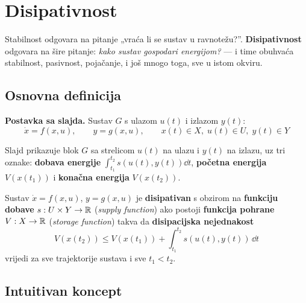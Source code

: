 \section{Disipativnost}
\label{sec:disipativnost}

Stabilnost odgovara na pitanje „vraća li se sustav u ravnotežu?”.
\textbf{Disipativnost} odgovara na šire pitanje: \emph{kako sustav gospodari
energijom?} --- i time obuhvaća stabilnost, pasivnost, pojačanje, i još mnogo
toga, sve u istom okviru.

\subsection{Osnovna definicija}

\textbf{Postavka sa slajda.} Sustav $G$ s ulazom $u(t)$ i izlazom $y(t)$:
\[
\dot x = f(x,u), \qquad y = g(x,u), \qquad
x(t) \in X,\; u(t) \in U,\; y(t) \in Y
\]

Slajd prikazuje blok $G$ sa strelicom $u(t)$ na ulazu i $y(t)$ na izlazu, uz
tri oznake: \textbf{dobava energije} $\int_{t_1}^{t_2}s(u(t),y(t))\dd t$,
\textbf{početna energija} $V(x(t_1))$ i \textbf{konačna energija} $V(x(t_2))$.

\begin{definicija}[Disipativnost]
Sustav $\dot x = f(x,u)$, $y = g(x,u)$ je \textbf{disipativan} s obzirom na
\textbf{funkciju dobave} $s : U \times Y \to \mathbb{R}$ (\emph{supply function}) ako
postoji \textbf{funkcija pohrane} $V : X \to \mathbb{R}$ (\emph{storage function})
takva da \textbf{disipacijska nejednakost}
\begin{equation}
\label{eq:disipacijska}
V(x(t_2)) \le V(x(t_1)) + \int_{t_1}^{t_2} s(u(t), y(t))\,\dd t
\end{equation}
vrijedi za sve trajektorije sustava i sve $t_1 < t_2$.
\end{definicija}

\subsection{Intuitivan koncept}

